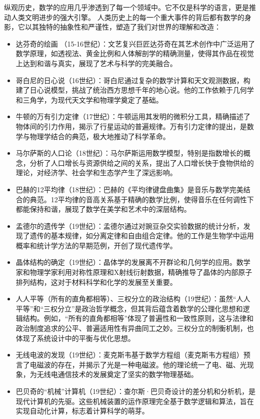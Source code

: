 纵观历史，数学的应用几乎渗透到了每一个领域中。它不仅是科学的语言，更是推动人类文明进步的强大引擎。
人类历史上的每一个重大事件的背后都有数学的身影，它以其独特的抽象性和严谨性，塑造了我们对世界的理解和改造：
\begin{itemize}
\item 达芬奇的绘画 （15-16世纪）：文艺复兴巨匠达芬奇在其艺术创作中广泛运用了数学原理，如透视法、黄金比例和人体解剖学的精确测量，使得其作品在视觉上达到和谐与真实，展现了艺术与科学的完美融合。
\item 哥白尼的日心说（16世纪）：哥白尼通过复杂的数学计算和天文观测数据，构建了日心说模型，挑战了统治西方思想千年的地心说。他的工作依赖于几何学和三角学，为现代天文学和物理学奠定了基础。
\item 牛顿的万有引力定律（17世纪）：牛顿运用其发明的微积分工具，精确描述了物体间的引力作用，揭示了行星运动的普遍规律。万有引力定律的提出，是数学与物理学结合的典范，极大地推动了科学革命。
\item 马尔萨斯的人口论（18世纪）：马尔萨斯运用数学模型，特别是指数增长的概念，分析了人口增长与资源供给之间的关系，提出了人口增长快于食物供给的理论，对经济学、社会学和生态学产生了深远影响。
\item 巴赫的12平均律（18世纪）：巴赫的《平均律键盘曲集》是音乐与数学完美结合的典范。12平均律的音高关系基于精确的数学比例，使得音乐在任何调性下都能保持和谐，展现了数学在美学和艺术中的深层结构。
\item 孟德尔的遗传学（19世纪）：孟德尔通过对豌豆杂交实验数据的统计分析，发现了遗传的基本规律，如分离定律和自由组合定律。他的工作是生物学中运用概率和统计学方法的早期范例，开创了现代遗传学。
\item 晶体结构的确定（19世纪）：晶体学的发展离不开群论和几何学的应用。数学家和物理学家利用对称性原理和X射线衍射数据，精确推导了晶体的内部原子排列结构，这对于材料科学和化学的发展至关重要。
\item 人人平等（所有的直角都相等）、三权分立的政治结构（19世纪）：虽然“人人平等”和“三权分立”是政治哲学概念，但其背后蕴含着数学的公理化思想和逻辑结构。例如，“所有的直角都相等”体现了普遍性和一致性原则，这与法律和政治制度追求的公平、普遍适用性有异曲同工之妙。三权分立的制衡机制，也体现了系统设计中的平衡与优化思想。
\item 无线电波的发现（19世纪）：麦克斯韦基于数学方程组（麦克斯韦方程组）预言了电磁波的存在，并揭示了光是一种电磁波。他的理论统一了电、磁、光现象，为无线电通信技术的发展奠定了坚实的数学物理基础。
\item 巴贝奇的“机械”计算机（19世纪）：查尔斯·巴贝奇设计的差分机和分析机，是现代计算机的先驱。这些机械装置的运作原理完全基于数学逻辑和算法，旨在实现自动化计算，标志着计算科学的萌芽。

\end{itemize}
